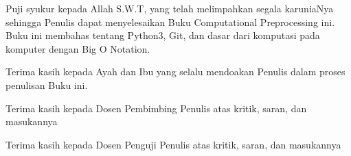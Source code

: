 Puji syukur kepada Allah S.W.T, yang telah melimpahkan segala karuniaNya sehingga Penulis dapat menyelesaikan Buku Computational Preprocessing ini. Buku ini membahas tentang Python3, Git, dan dasar dari komputasi pada komputer dengan Big O Notation.

Terima kasih kepada Ayah dan Ibu yang selalu mendoakan Penulis dalam proses penulisan Buku ini.

Terima kasih kepada Dosen Pembimbing Penulis atas kritik, saran, dan masukannya

Terima kasih kepada Dosen Penguji Penulis atas kritik, saran, dan masukannya

